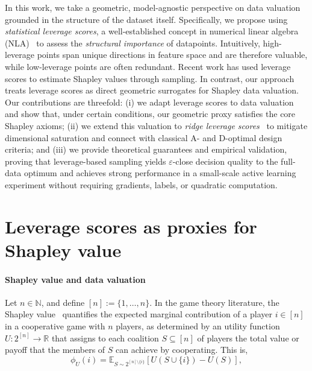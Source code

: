 \documentclass{article}
\def\E{\mathbb{E}}
\newcommand{\1}{\mathbbm{1}}
\begin{document}
In this work, we take a geometric, model-agnostic perspective on data valuation grounded in the structure of the dataset itself.
%
Specifically, we propose using \emph{statistical leverage scores}, a well-established concept in numerical linear algebra (NLA)~\cite{drineas2012fast} to assess the \emph{structural importance} of datapoints.
%
Intuitively, high-leverage points span unique directions in feature space and are therefore valuable, while low-leverage points are often redundant.
%
Recent work has used leverage scores to estimate Shapley values \cite{musco2024provably, witter2025regression} through sampling.
%
In contrast, our approach treats leverage scores as direct geometric surrogates for Shapley data valuation.
%
Our contributions are threefold:
%
(i) we adapt leverage scores to data valuation and show that, under certain conditions, our geometric proxy satisfies the core Shapley axioms;
%
(ii) we extend this valuation to \emph{ridge leverage scores}~\cite{cohen2015ridge,musco2017recursive,drineas2012fast} to mitigate dimensional saturation and connect with classical A- and D-optimal design criteria; and
%
(iii) we provide theoretical guarantees and empirical validation, proving that leverage-based sampling yields $\varepsilon$-close decision quality to the full-data optimum and achieves strong performance in a small-scale active learning experiment without requiring gradients, labels, or quadratic computation.

\section{Leverage scores as proxies for Shapley value}

\paragraph{Shapley value and data valuation} Let \( n \in \mathbb{N} \), and define \( [n] := \{1, \dots, n\} \).
%
In the game theory literature, the Shapley value~\cite{shapley1953value} quantifies the expected marginal contribution of a player \( i \in [n] \) in a cooperative game with \( n \) players, as determined by an utility function \( U: 2^{[n]} \rightarrow \mathbb{R} \) that assigns to each coalition \( S \subseteq [n] \) of players the total value or payoff that the members of \( S \) can achieve by cooperating. This is,
%
\begin{equation}
    \label{eq:shapley}
    \phi_U(i) = \E_{S \sim 2^{[n] \setminus \{i\}}} \left[ U(S \cup \{i\}) - U(S)\right],
\end{equation}
\end{document}

